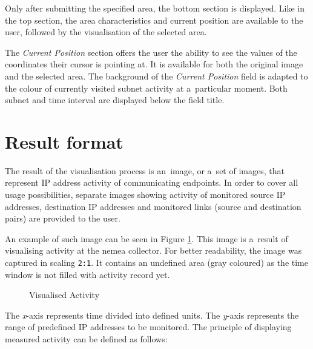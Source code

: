 Only after submitting the specified area, the bottom section is displayed.
Like in the top section, the area characteristics and current position are available
to the user, followed by the visualisation of the selected area.

The \textit{Current Position} section offers the user the ability to see the values of
the coordinates their cursor is pointing at. It is available for both the
original image and the selected area. The background of the \textit{Current Position}
field is adapted to the colour of currently visited subnet activity at a~particular moment.
Both subnet and time interval are displayed below the field title. 

\section{Result format}\label{sec:bitmap}
The result of the visualisation process is an~image, or a~set of images,
that represent IP address activity of communicating endpoints.
In order to cover all usage possibilities, separate images showing activity of monitored source IP addresses,
destination IP addresses and monitored links (source and destination pairs) are provided to the user.

An example of such image can be seen in Figure \ref{fig:image_example}. This
image is a~result of visualising activity at the nemea collector.
For better readability, the image was captured in scaling \texttt{2:1}. It contains
an undefined area (gray coloured) as the time window is not filled with activity record yet.

\begin{figure}[H]
   \begin{center}
		 \hfill
      \caption{Visualised Activity} \label{fig:image_example}
	\end{center}
\end{figure}

The \textit{x}-axis represents time divided into defined units.
The \textit{y}-axis represents the range of predefined IP addresses to be
monitored. The principle of displaying measured activity can be defined as follows:


